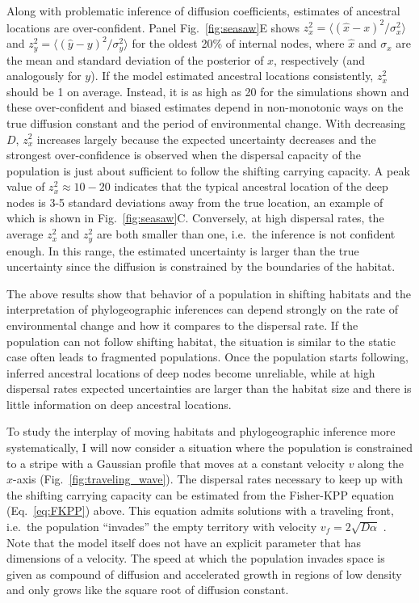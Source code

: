 \documentclass[aps,rmp, twocolumn]{revtex4}
\newcommand{\vfkpp}{v_f}
\begin{document}
Along with problematic inference of diffusion coefficients, estimates of ancestral locations are over-confident.
Panel Fig.~\ref{fig:seasaw}E shows $z_x^2 = \langle (\hat{x} - x)^2/\sigma_x^2 \rangle$ and $z_y^2=\langle (\hat{y} - y)^2/\sigma_y^2\rangle$ for the oldest 20\% of internal nodes, where $\hat{x}$ and $\sigma_x$ are the mean and standard deviation of the posterior of $x$, respectively (and analogously for $y$).
If the model estimated ancestral locations consistently, $z_x^2$ should be 1 on average.
Instead, it is as high as 20 for the simulations shown and these over-confident and biased estimates depend in non-monotonic ways on the true diffusion constant and the period of environmental change.
With decreasing $D$, $z_x^2$ increases largely because the expected uncertainty decreases and the strongest over-confidence is observed when the dispersal capacity of the population is just about sufficient to follow the shifting carrying capacity.
A peak value of $z_x^2\approx 10-20$ indicates that the typical ancestral location of the deep nodes is 3-5 standard deviations away from the true location, an example of which is shown in Fig.~\ref{fig:seasaw}C.
Conversely, at high dispersal rates, the average $z_x^2$ and $z_y^2$ are both smaller than one, i.e.~the inference is not confident enough.
In this range, the estimated uncertainty is larger than the true uncertainty since the diffusion is constrained by the boundaries of the habitat.


The above results show that behavior of a population in shifting habitats and the interpretation of phylogeographic inferences can depend strongly on the rate of environmental change and how it compares to the dispersal rate.
If the population can not follow shifting habitat, the situation is similar to the static case often leads to fragmented populations.
Once the population starts following, inferred ancestral locations of deep nodes become unreliable, while at high dispersal rates expected uncertainties are larger than the habitat size and there is little information on deep ancestral locations.

To study the interplay of moving habitats and phylogeographic inference more systematically, I will now consider a situation where the population is constrained to a stripe with a Gaussian profile that moves at a constant velocity $v$ along the $x$-axis (Fig.~\ref{fig:traveling_wave}).
The dispersal rates necessary to keep up with the shifting carrying capacity can be estimated from the Fisher-KPP equation (Eq.~\ref{eq:FKPP}) above.
This equation admits solutions with a traveling front, i.e.~the population ``invades'' the empty territory with velocity $\vfkpp = 2\sqrt{D \alpha}$ \citep{fisher_wave_1937,KPP1937,hallatschek_life_2010}.
Note that the model itself does not have an explicit parameter that has dimensions of a velocity.
The speed at which the population invades space is given as compound of diffusion and accelerated growth in regions of low density and only grows like the square root of diffusion constant.
\end{document}
